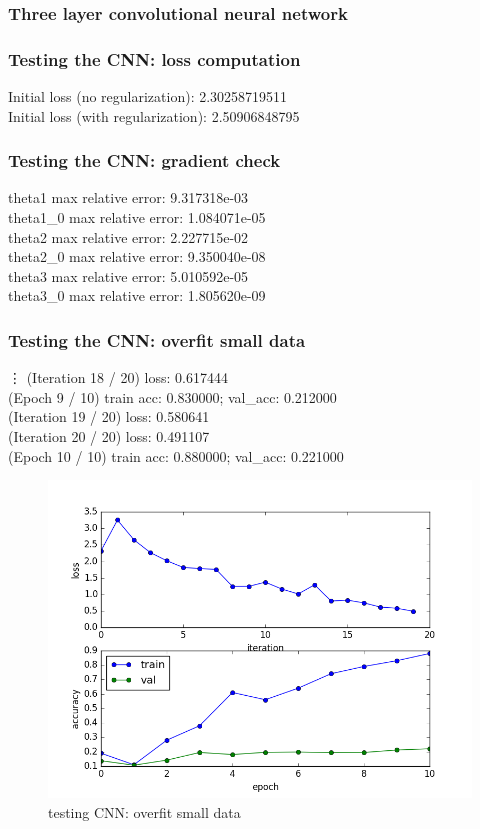 \documentclass{article}
\begin{document}
\subsubsection{Three layer convolutional neural network}

\subsubsection*{Testing the CNN: loss computation}
{\footnotesize
Initial loss (no regularization):  2.30258719511\\
Initial loss (with regularization):  2.50906848795\\
}

\subsubsection*{Testing the CNN: gradient check}
{\footnotesize
theta1 max relative error: 9.317318e-03\\
theta1\_0 max relative error: 1.084071e-05\\
theta2 max relative error: 2.227715e-02\\
theta2\_0 max relative error: 9.350040e-08\\
theta3 max relative error: 5.010592e-05\\
theta3\_0 max relative error: 1.805620e-09\\
}
\subsubsection*{Testing the CNN: overfit small data}

{\footnotesize
\vdots
(Iteration 18 / 20) loss: 0.617444\\
(Epoch 9 / 10) train acc: 0.830000; val\_acc: 0.212000\\
(Iteration 19 / 20) loss: 0.580641\\
(Iteration 20 / 20) loss: 0.491107\\
(Epoch 10 / 10) train acc: 0.880000; val\_acc: 0.221000\\
}
\begin{figure}[H]
\centering
\includegraphics[width=.5\linewidth]{./figure_3_2_5}
\caption{testing CNN: overfit small data}
\label{fig:3_2_5}
\end{figure}
\end{document}
